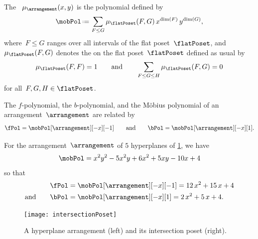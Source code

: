 \begin{definition}
The ~$\mu_{\arrangement}(x,y)$ is the polynomial defined by
\[
\mobPol \eqdef \sum_{F \le G} \mu_{\flatPoset}(F,G) \, x^{\dim(F)} \, y^{\dim(G)},
\]
where~$F \le G$ ranges over all intervals of the flat poset~$\flatPoset$, and~$\mu_{\flatPoset}(F,G)$ denotes the  on the flat poset~$\flatPoset$ defined as usual by
\[
\mu_{\flatPoset}(F, F) = 1
\qquad\text{and}\qquad
\sum_{F \le G \le H} \mu_{\flatPoset}(F,G) = 0
\]
for all~$F, G, H \in \flatPoset$.
\end{definition}

\begin{theorem}
\label{thm:Zaslavsky}
The $f$-polynomial, the $b$-polynomial, and the M\"obius polynomial of an arrangement~$\arrangement$ are related by
\[
\fPol = \mobPol[\arrangement][-x][-1]
\qquad\text{and}\qquad
\bPol = \mobPol[\arrangement][-x][1].
\]
\end{theorem}


\begin{example}
For the arrangement~$\arrangement$ of $5$ hyperplanes of \cref{fig:arrangement}, we have
\[
\mobPol = x^2y^2 - 5x^2y + 6x^2 + 5xy - 10x + 4
\]
so that
\begin{align*}
\fPol & = \mobPol[\arrangement][-x][-1] = 12 \, x^2 + 15 \, x + 4 \\
\text{and}\qquad
\bPol & = \mobPol[\arrangement][-x][1] = 2 \, x^2 + 5 \, x + 4.
\end{align*}
%
\begin{figure}
	\texttt{[image: intersectionPoset]}
	\caption{A hyperplane arrangement (left) and its intersection poset (right).}
	\label{fig:arrangement}
\end{figure}
\end{example}

